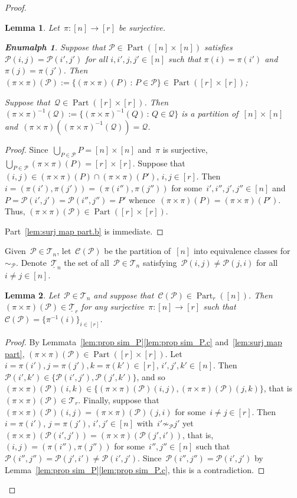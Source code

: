 \documentclass[10pt,a4paper]{amsart}
\newtheorem{lemma}{Lemma}
\newtheorem{enumalph}{Enumalph}
\DeclareMathOperator{\Part}{Part}
\begin{document}
\begin{proof}
\begin{lemma}
Let~$\pi:[n]\to[r]$
be surjective. 
\begin{enumalph}
    \item\label{lem:surj map part.a} Suppose that $\mathcal P\in\Part([n]\times[n])$
    satisfies 
    $\mathcal P(i,j)=\mathcal P(i',j')$ for all $i,i',j,j'\in[n]$ such that $\pi(i)=\pi(i')$ and~$\pi(j)=\pi(j')$.
Then~$(\pi\times\pi)(\mathcal P):=\{ (\pi\times\pi)(P)\,:\, P\in\mathcal P\}\in \Part([r]\times[r])$;
\item\label{lem:surj map part.b} Suppose that~$\mathcal Q\in \Part([r]\times[r])$.
Then~$(\pi\times\pi)^{-1}(\mathcal Q):=\{ (\pi\times\pi)^{-1}(Q)\,:\, Q\in\mathcal Q\}$
is a partition of~$[n]\times[n]$ and~$(\pi\times\pi)((\pi\times\pi)^{-1}(\mathcal Q))=\mathcal Q$.
\end{enumalph}
\end{lemma}
\begin{proof}
Since~$\bigcup_{P\in\mathcal P} P=[n]\times[n]$ and~$\pi$
is surjective, $\bigcup_{P\in\mathcal P}
(\pi\times\pi)(P)=[r]\times[r]$. Suppose that~$(i,j)\in 
(\pi\times\pi)(P)\cap(\pi\times\pi)(P')$, $i,j\in[r]$. Then~$i=(\pi(i'),
\pi(j'))=(\pi(i''),\pi(j''))$ for some~$i',i'',j',j''\in[n]$
and~$P=\mathcal P(i',j')=\mathcal P(i'',j'')=P'$
whence~$(\pi\times\pi)(P)=(\pi\times\pi)(P')$.
Thus, $(\pi\times\pi)(\mathcal P)\in\Part([r]\times[r])$.

Part~\ref{lem:surj map part.b} is immediate.
\end{proof}


Given~$\mathcal P\in\mathscr T_n$, let~$\mathcal C(\mathcal P)$ be
the partition of~$[n]$ into equivalence classes for~$\sim_{\mathcal P}$. Denote~$\underline{\mathscr T}_n$ the set of 
all~$\mathcal P\in\mathscr T_n$ satisfying~$\mathcal P(i,j)\not=\mathcal P(j,i)$ for all~$i\not=j\in[n]$.
\begin{lemma}\label{lem:surj trans part}
Let~$\mathcal P\in\mathscr T_n$ and suppose that~$\mathcal C(\mathcal P)\in\Part_r([n])$. Then
$(\pi\times\pi)(\mathcal P)\in \underline{\mathscr T}_r$ 
for any surjective~$\pi:[n]\to[r]$ such that~$\mathcal C(\mathcal P)=\{ \pi^{-1}(i)\}_{i\in[r]}$.
\end{lemma}
\begin{proof}
By
Lemmata~\ref{lem:prop sim_P}\ref{lem:prop sim_P.c} and~\ref{lem:surj map part}, 
$(\pi\times\pi)(\mathcal P)\in\Part([r]\times[r])$. Let~$i=\pi(i'),j=\pi(j'),k=\pi(k')\in[r]$, $i',j',k'\in[n]$.
Then~$\mathcal P(i',k')\in \{ \mathcal P(i',j'),\mathcal P(j',k')\}$,
and so $(\pi\times\pi)(\mathcal P)(i,k)\in\{(\pi\times\pi)(\mathcal P)(i,j),
(\pi\times\pi)(\mathcal P)(j,k)\}$, that is~$(\pi\times\pi)(\mathcal P)\in\mathscr T_r$.
Finally, suppose that~$(\pi\times\pi)(\mathcal P)(i,j)=(\pi\times\pi)(\mathcal P)(j,i)$ 
for some~$i\not=j\in[r]$. Then
$i=\pi(i')$, $j=\pi(j')$, $i',j'\in[n]$ with~$i'\not\sim_{\mathcal P}j'$
yet~$(\pi\times\pi)(\mathcal P(i',j'))=(\pi\times\pi)(\mathcal P(j',i'))$, that
is, $(i,j)=(\pi(i''),\pi(j''))$ for some~$i'',j''\in[n]$ such that~$\mathcal P(i'',j'')=
\mathcal P(j',i')\not=\mathcal P(i',j')$. Since~$\mathcal P(i'',j'')=\mathcal P(i',j')$
by Lemma~\ref{lem:prop sim_P}\ref{lem:prop sim_P.c}, this is a contradiction.
\end{proof}


\end{proof}
\end{document}
